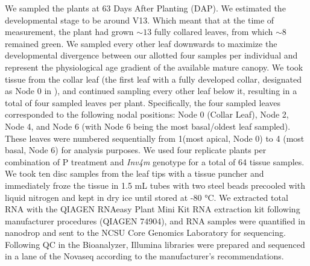 \documentclass[9pt,twocolumn,twoside]{rilabRxiv}
\newcommand{\invfour}{\textit{Inv4m}\xspace}
\begin{document}
We sampled the plants at 63 Days After Planting ($\text{DAP}$).
We estimated the developmental stage to be around V13. Which meant that at the time of measurement, the plant had grown $\sim 13$ fully collared leaves, from which $\sim 8$ remained green.
We sampled every other leaf downwards to maximize the developmental divergence between our allotted four samples per individual and represent the physiological age gradient of the available mature canopy.
We took tissue from the collar leaf (the first leaf with a fully developed collar, designated as Node 0 in \cite{ciganda2008}), and continued sampling every other leaf below it, resulting in a total of four sampled leaves per plant.
Specifically, the four sampled leaves corresponded to the following nodal positions: Node 0 (Collar Leaf), Node 2, Node 4, and Node 6 (with Node 6 being the most basal/oldest leaf sampled). These leaves were numbered sequentially from 1(most apical, Node 0) to  4 (most basal, Node 6) for analysis purposes. 
We used four replicate plants per combination of  P treatment and \invfour genotype for a total of 64 tissue samples. 
We took ten disc samples from the leaf tips with a tissue puncher and immediately froze the tissue in 1.5 mL tubes with two steel beads precooled with liquid nitrogen and kept in dry ice until stored at -80 °C.
We extracted total RNA with the QIAGEN RNAeasy Plant Mini Kit  RNA extraction kit following manufacturer procedures (QIAGEN 74904), and RNA samples were quantified in nanodrop and sent to the NCSU Core Genomics Laboratory for sequencing.
Following QC in the Bioanalyzer, Illumina libraries were prepared and sequenced in a lane of the Novaseq according to the manufacturer's recommendations.
\end{document}
